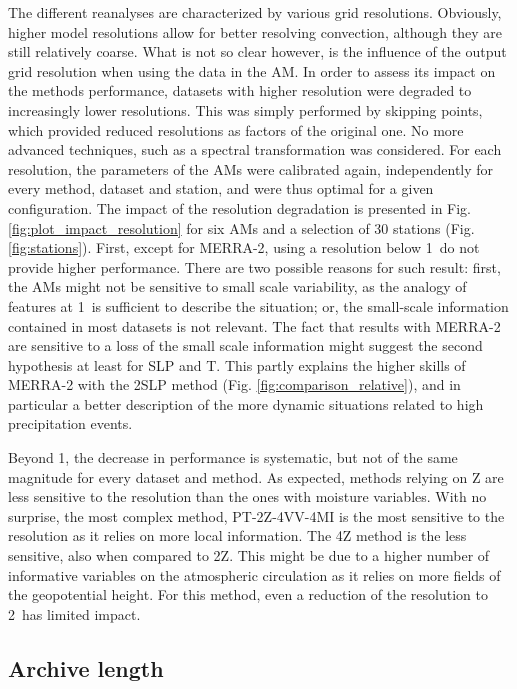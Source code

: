 \documentclass{ametsoc}
\begin{document}
The different reanalyses are characterized by various grid resolutions. Obviously, higher model resolutions allow for better resolving convection, although they are still relatively coarse. What is not so clear however, is the influence of the output grid resolution when using the data in the AM. In order to assess its impact on the methods performance, datasets with higher resolution were degraded to increasingly lower resolutions. This was simply performed by skipping points, which provided reduced resolutions as factors of the original one. No more advanced techniques, such as a spectral transformation was considered. For each resolution, the parameters of the AMs were calibrated again, independently for every method, dataset and station, and were thus optimal for a given configuration. The impact of the resolution degradation is presented in Fig. \ref{fig:plot_impact_resolution} for six AMs and a selection of 30 stations (Fig. \ref{fig:stations}). First, except for MERRA-2, using a resolution below 1\degree\ do not provide higher performance. There are two possible reasons for such result: first, the AMs might not be sensitive to small scale variability, as the analogy of features at 1\degree\ is sufficient to describe the situation; or, the small-scale information contained in most datasets is not relevant. The fact that results with MERRA-2 are sensitive to a loss of the small scale information might suggest the second hypothesis at least for SLP and T. This partly explains the higher skills of MERRA-2 with the 2SLP method (Fig. \ref{fig:comparison_relative}), and in particular a better description of the more dynamic situations related to high precipitation events.

Beyond 1\degree, the decrease in performance is systematic, but not of the same magnitude for every dataset and method. As expected, methods relying on Z are less sensitive to the resolution than the ones with moisture variables. With no surprise, the most complex method, PT-2Z-4VV-4MI is the most sensitive to the resolution as it relies on more local information. The 4Z method is the less sensitive, also when compared to 2Z. This might be due to a higher number of informative variables on the atmospheric circulation as it relies on more fields of the geopotential height. For this method, even a reduction of the resolution to 2\degree\ has limited impact.


\subsection{Archive length}
\label{sec:length}
\end{document}
